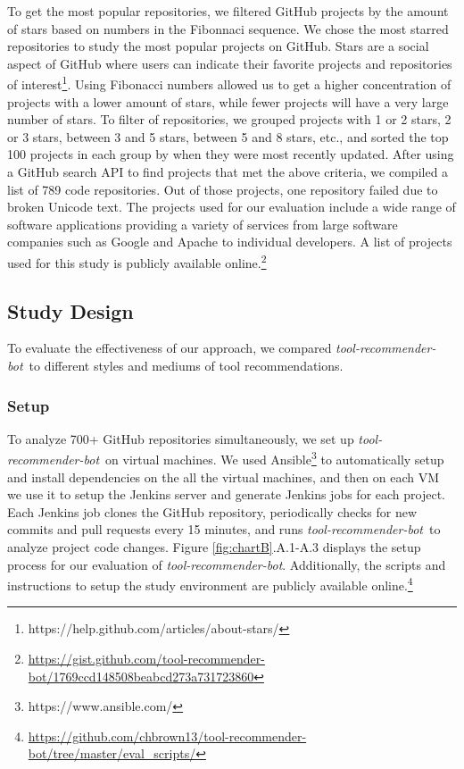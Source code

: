 \documentclass[sigconf,review,anonymous]{acmart}
\newcommand{\tool}{\textsl{tool-recommender-bot}}
\begin{document}
To get the most popular repositories, we filtered GitHub projects by the amount of stars based on numbers in the Fibonnaci sequence. We chose the most starred repositories to study the most popular projects on GitHub. Stars are a social aspect of GitHub where users can indicate their favorite projects and repositories of interest\footnote{https://help.github.com/articles/about-stars/}. Using Fibonacci numbers allowed us to get a higher concentration of projects with a lower amount of stars, while fewer projects will have a very large number of stars. To filter of repositories, we grouped projects with 1 or 2 stars, 2 or 3 stars, between 3 and 5 stars, between 5 and 8 stars, etc., and sorted the top 100 projects in each group by when they were most recently updated. After using a GitHub search API to find projects that met the above criteria, we compiled a list of 789 code repositories. Out of those projects, one repository failed due to broken Unicode text. %
The projects used for our evaluation include a wide range of software applications providing a variety of services from large software companies such as Google and Apache to individual developers. A list of projects used for this study is publicly available online.\footnote{\url{https://gist.github.com/tool-recommender-bot/1769ccd148508beabcd273a731723860}}

\subsection{Study Design}

To evaluate the effectiveness of our approach, we compared \tool~to different styles and mediums of tool recommendations.

\subsubsection{Setup}

To analyze 700+ GitHub repositories simultaneously, we set up \tool~on virtual machines. We used Ansible\footnote{https://www.ansible.com/} to automatically setup and install dependencies on the all the virtual machines, and then on each VM we use it to setup the Jenkins server and generate Jenkins jobs for each project. Each Jenkins job clones the GitHub repository, periodically checks for new commits and pull requests every 15 minutes, and runs \tool~to analyze project code changes. Figure \ref{fig:chartB}.A.1-A.3 displays the setup process for our evaluation of \tool. Additionally, the scripts and instructions to setup the study environment are publicly available online.\footnote{\url{https://github.com/chbrown13/tool-recommender-bot/tree/master/eval_scripts/}}
\end{document}
